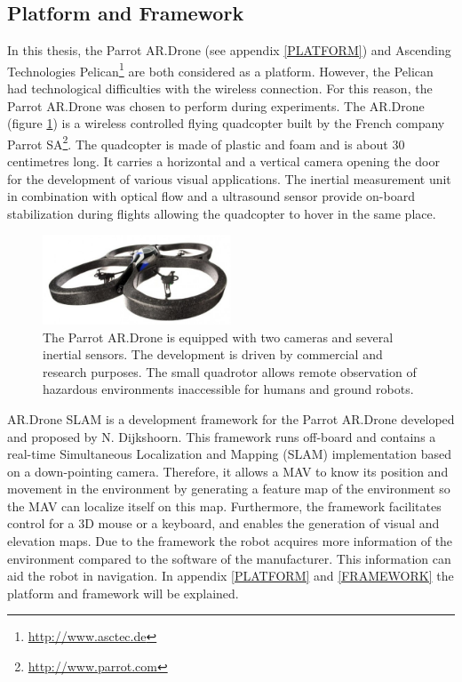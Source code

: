 \documentclass[a4paper]{article}
\begin{document}
\subsection{Platform and Framework}
In this thesis, the Parrot AR.Drone (see
appendix \ref{PLATFORM}) and Ascending Technologies Pelican\footnote{\url{http://www.asctec.de}} are both considered as a platform. However, the Pelican had technological difficulties with the wireless connection. For this reason, the Parrot AR.Drone was chosen to perform during experiments. The AR.Drone (figure \ref{ardrone}) is a wireless controlled flying quadcopter built by the French company Parrot SA\footnote{\url{http://www.parrot.com}}. The quadcopter is made of plastic and foam and is about 30 centimetres long. It carries a horizontal and a vertical camera opening the door for the development of various visual applications. The inertial measurement unit in combination with optical flow and a ultrasound sensor provide on-board stabilization during flights allowing the quadcopter to hover in the same place. 

\begin{figure}[!ht]
	\centering
	\includegraphics[width=0.5\textwidth]{images/ardrone.jpg}
	\caption{The Parrot AR.Drone is equipped with two cameras and several inertial sensors. The development is driven by commercial and research purposes. The small quadrotor allows remote observation of hazardous environments inaccessible for humans and ground robots.}
	\label{ardrone}
\end{figure}

AR.Drone SLAM \cite{Dijkshoorn2012} is a development framework for the Parrot AR.Drone developed and proposed by N. Dijkshoorn. This framework runs off-board and contains a real-time Simultaneous Localization and Mapping (SLAM) implementation based on a down-pointing camera. Therefore, it allows a MAV to know its position and movement in the environment by generating a feature map of the environment so the MAV can localize itself on this map. Furthermore, the framework facilitates control for a 3D mouse or a keyboard, and enables the generation of visual and elevation maps. Due to the framework the robot acquires more information of the environment compared to the software of the manufacturer. This information can aid the robot in navigation. In appendix \ref{PLATFORM} and \ref{FRAMEWORK} the platform and framework will be explained.
\end{document}
